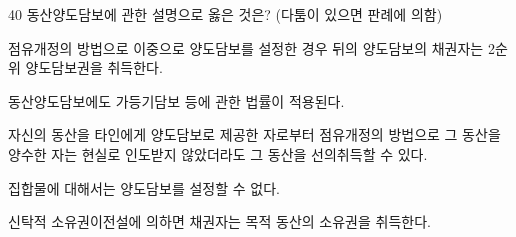 \begin{question}{40}
동산양도담보에 관한 설명으로 옳은 것은? (다툼이 있으면 판례에 의함)
\begin{choices}
  \item 점유개정의 방법으로 이중으로 양도담보를 설정한 경우 뒤의 양도담보의 채권자는 2순위 양도담보권을 취득한다.
  \item 동산양도담보에도 가등기담보 등에 관한 법률이 적용된다.
  \item 자신의 동산을 타인에게 양도담보로 제공한 자로부터 점유개정의 방법으로 그 동산을 양수한 자는 현실로 인도받지 않았더라도 그 동산을 선의취득할 수 있다.
  \item 집합물에 대해서는 양도담보를 설정할 수 없다.
  \item 신탁적 소유권이전설에 의하면 채권자는 목적 동산의 소유권을 취득한다.
\end{choices}
\end{question}
